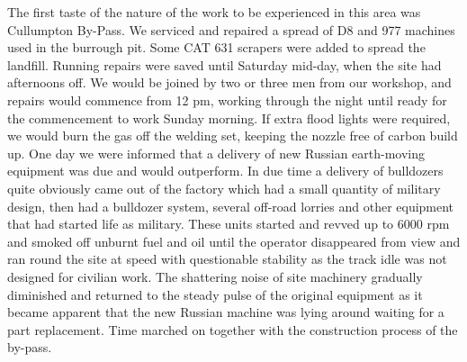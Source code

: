 The first taste of the nature of the work to be experienced in this area was
Cullumpton By-Pass. We serviced and repaired a spread of D8 and 977 machines
used in the burrough pit. Some CAT 631 scrapers were added to spread the
landfill. Running repairs were saved until Saturday mid-day, when the site had
afternoons off. We would be joined by two or three men from our workshop, and
repairs would commence from 12 pm, working through the night until ready for
the commencement to work Sunday morning. If extra flood lights were required,
we would burn the gas off the welding set, keeping the nozzle free of carbon
build up. One day we were informed that a delivery of new Russian earth-moving
equipment was due and would outperform. In due time a delivery of bulldozers
quite obviously came out of the factory which had a small quantity of military
design, then had a bulldozer system, several off-road lorries and other
equipment that had started life as military. These units started and revved up
to 6000 rpm and smoked off unburnt fuel and oil until the operator disappeared
from view and ran round the site at speed with questionable stability as the
track idle was not designed for civilian work. The shattering noise of site
machinery gradually diminished and returned to the steady pulse of the original
equipment as it became apparent that the new Russian machine was lying around
waiting for a part replacement. Time marched on together with the construction
process of the by-pass.

